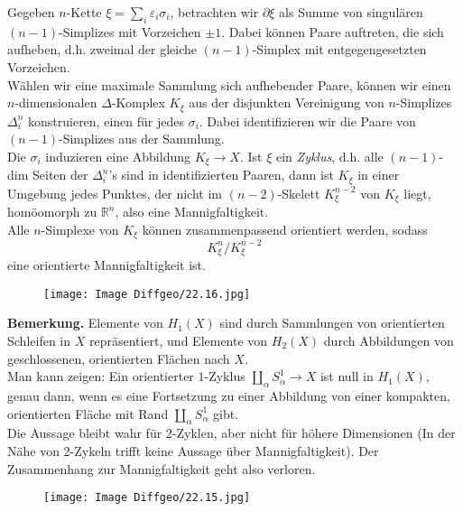 \documentclass[fleqn, 12pt, letterpaper]{article}
\begin{document}
Gegeben $n$-Kette $\xi = \sum_i \varepsilon_i \sigma_i$, betrachten wir $\partial \xi$ als Summe von singulären $(n-1)$-Simplizes mit Vorzeichen $\pm 1$. Dabei können Paare auftreten, die sich aufheben, d.h. zweimal der gleiche $(n-1)$-Simplex mit entgegengesetzten Vorzeichen. \\

Wählen wir eine maximale Sammlung sich aufhebender Paare, können wir einen $n$-dimensionalen $\Delta$-Komplex $K_\xi$ aus der disjunkten Vereinigung von $n$-Simplizes $\Delta^n_i$ konstruieren, einen für jedes $\sigma_i$. Dabei identifizieren wir die Paare von $(n-1)$-Simplizes aus der Sammlung.\\

Die $\sigma_i$ induzieren eine Abbildung $K_\xi \to X$. Ist $\xi$ ein \emph{Zyklus}, d.h. alle $(n-1)$-dim Seiten der $\Delta^n_i$'s sind in identifizierten Paaren, dann ist $K_\xi$ in einer Umgebung jedes Punktes, der nicht im $(n-2)$-Skelett $K_\xi^{n-2}$ von $K_\xi$ liegt, homöomorph zu $\mathbb{R}^n$, also eine Mannigfaltigkeit.\\

Alle $n$-Simplexe von $K_\xi$ können zusammenpassend orientiert werden, sodass 
\[
K_\xi^n \big/ K_\xi^{n-2}
\]
eine orientierte Mannigfaltigkeit ist.

  \begin{figure}[H]
    \centering
    \texttt{[image: Image Diffgeo/22.16.jpg]}
 \end{figure}

\textbf{Bemerkung.} Elemente von $H_1(X)$ sind durch Sammlungen von orientierten Schleifen in $X$ repräsentiert, und Elemente von $H_2(X)$
durch Abbildungen von geschlossenen, orientierten Flächen nach $X$.\\

Man kann zeigen: Ein orientierter $1$-Zyklus $\coprod_\alpha S_\alpha^1 \to X$ ist null in $H_1(X)$, genau dann, wenn es eine Fortsetzung zu einer Abbildung
von einer kompakten, orientierten Fläche mit Rand $\coprod_\alpha S_\alpha^1$ gibt.\\

Die Aussage bleibt wahr für $2$-Zyklen, aber nicht für höhere Dimensionen (In der Nähe von 2-Zykeln trifft keine Aussage über Mannigfaltigkeit). Der Zusammenhang zur Mannigfaltigkeit geht also verloren.
  \begin{figure}[H]
    \centering
    \texttt{[image: Image Diffgeo/22.15.jpg]}
 \end{figure}
\end{document}
